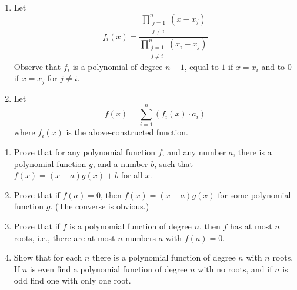 \begin{solution}
  \begin{enumerate}[label = (\alph*)]
    \item Let
    \begin{equation*}
      f_i(x) = \frac{\displaystyle\prod_{\substack{j = 1 \\ j \neq i}}^{n} (x - x_j)}%
      {\displaystyle\prod_{\substack{j = 1 \\ j \neq i}}^{n} (x_i - x_j)}
    \end{equation*}
    Observe that $f_i$ is a polynomial of degree $n - 1$, equal to $1$ if $x = x_i$
    and to $0$ if $x = x_j$ for $j \neq i$.
    \item Let
    \begin{equation*}
      f(x) = \sum_{i = 1}^{n} (f_i(x) \cdot a_i)
    \end{equation*}
    where $f_i(x)$ is the above-constructed function.
  \end{enumerate}
\end{solution}

\begin{pr} \label{3.7}
  \begin{enumerate}[label = (\alph*)]
    \item \label{3.7.a} Prove that for any polynomial function $f$, and any number $a$, there is a
    polynomial function $g$, and a number $b$, such that $f(x) = (x - a)g(x) + b$
    for all $x$.
    \item \label{3.7.b} Prove that if $f(a) = 0$, then $f(x) = (x - a)g(x)$ for some polynomial
    function $g$. (The converse is obvious.)
    \item Prove that if $f$ is a polynomial function of degree $n$, then $f$ has
    at most $n$ roots, i.e., there are at most $n$ numbers $a$ with $f(a) = 0$.
    \item Show that for each $n$ there is a polynomial function of degree $n$ with
    $n$ roots. If $n$ is even find a polynomial function of degree $n$ with no roots,
    and if $n$ is odd find one with only one root.
  \end{enumerate}
\end{pr}

